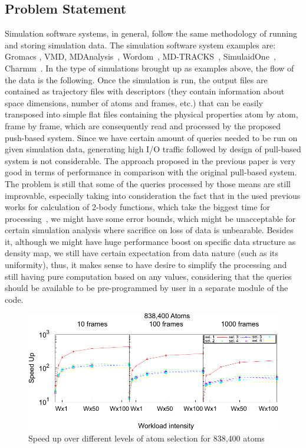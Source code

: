 \documentclass[10pt,journal,final,letterpaper,twocolumn]{IEEEtran}
\begin{document}
\subsection{Problem Statement}
Simulation software systems, in general, follow the same methodology of running and storing simulation data. The simulation software system examples are: Gromacs \cite{GROMACS4}, VMD\cite{VMD}, MDAnalysis~\cite{MDAnalysis}, Wordom~\cite{wordom}, MD-TRACKS~\cite{MDtracks}, SimulaidOne~\cite{Simulaid}, Charmm~\cite{CHARMM}. In the type of simulations brought up as examples above, the flow of the data is the following. Once the simulation is run, the output files are contained as trajectory files with descriptors (they contain information about space dimensions, number of atoms and frames, etc.) that can be easily transposed into simple flat files containing the physical properties atom by atom, frame by frame, which are consequently read and processed by the proposed push-based system. Since we have certain amount of queries needed to be run on given simulation data, generating high I/O traffic followed by design of pull-based system is not considerable. The approach proposed in the previous paper is very good in terms of performance in comparison with the original pull-based system\cite{mainPaper}. The problem is still that some of the queries processed by those means are still improvable, especially taking into consideration the fact that in the used previous works for calculation of 2-body functions, which take the biggest time for processing~\cite{ytu:icde09, EDBT12}, we might have some error bounds, which might be unacceptable for certain simulation analysis where sacrifice on loss of data is unbearable. Besides it, although we might have huge performance boost on specific data structure as density map, we still have certain expectation from data nature (such as its uniformity), thus, it makes sense to have desire to simplify the processing and still having pure computation based on any values, considering that the queries should be available to be pre-programmed by user in a separate module of the code.


\begin{figure}
 \centerline{ \includegraphics[width=1\columnwidth]{images/speedup838K-pomalo-za-4-eps-converted-to.pdf} }
 \caption{ Speed up over different levels of atom selection for 838,400 atoms \cite{mainArticle} }
 \label{fg:sample_estimation_old_paper}
\end{figure}
\end{document}
